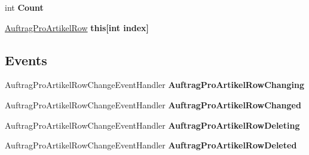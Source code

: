 \begin{DoxyCompactItemize}
\item 
int {\bfseries Count}\hypertarget{class_products_1_1_data_1_1ds_sage_1_1_auftrag_pro_artikel_data_table_a47c4fabdcbc829eaca033f8ce99e14df}{}\label{class_products_1_1_data_1_1ds_sage_1_1_auftrag_pro_artikel_data_table_a47c4fabdcbc829eaca033f8ce99e14df}

\item 
\hyperlink{class_products_1_1_data_1_1ds_sage_1_1_auftrag_pro_artikel_row}{Auftrag\+Pro\+Artikel\+Row} {\bfseries this\mbox{[}int index\mbox{]}}\hypertarget{class_products_1_1_data_1_1ds_sage_1_1_auftrag_pro_artikel_data_table_af24dca2dbc319ded4f3fd6f58d23396f}{}\label{class_products_1_1_data_1_1ds_sage_1_1_auftrag_pro_artikel_data_table_af24dca2dbc319ded4f3fd6f58d23396f}

\end{DoxyCompactItemize}
\subsection*{Events}
\begin{DoxyCompactItemize}
\item 
Auftrag\+Pro\+Artikel\+Row\+Change\+Event\+Handler {\bfseries Auftrag\+Pro\+Artikel\+Row\+Changing}\hypertarget{class_products_1_1_data_1_1ds_sage_1_1_auftrag_pro_artikel_data_table_ab0ef658135e639334991daee11e1af31}{}\label{class_products_1_1_data_1_1ds_sage_1_1_auftrag_pro_artikel_data_table_ab0ef658135e639334991daee11e1af31}

\item 
Auftrag\+Pro\+Artikel\+Row\+Change\+Event\+Handler {\bfseries Auftrag\+Pro\+Artikel\+Row\+Changed}\hypertarget{class_products_1_1_data_1_1ds_sage_1_1_auftrag_pro_artikel_data_table_a56bcc424e84b5715ac4d5ba034bd08b1}{}\label{class_products_1_1_data_1_1ds_sage_1_1_auftrag_pro_artikel_data_table_a56bcc424e84b5715ac4d5ba034bd08b1}

\item 
Auftrag\+Pro\+Artikel\+Row\+Change\+Event\+Handler {\bfseries Auftrag\+Pro\+Artikel\+Row\+Deleting}\hypertarget{class_products_1_1_data_1_1ds_sage_1_1_auftrag_pro_artikel_data_table_a4157c8119946f87f13994b478f3494eb}{}\label{class_products_1_1_data_1_1ds_sage_1_1_auftrag_pro_artikel_data_table_a4157c8119946f87f13994b478f3494eb}

\item 
Auftrag\+Pro\+Artikel\+Row\+Change\+Event\+Handler {\bfseries Auftrag\+Pro\+Artikel\+Row\+Deleted}\hypertarget{class_products_1_1_data_1_1ds_sage_1_1_auftrag_pro_artikel_data_table_a1e01f83e89f7e6b3a2d7a01ad2f61e7e}{}\label{class_products_1_1_data_1_1ds_sage_1_1_auftrag_pro_artikel_data_table_a1e01f83e89f7e6b3a2d7a01ad2f61e7e}

\end{DoxyCompactItemize}


